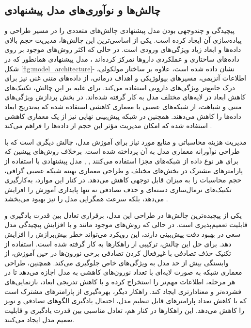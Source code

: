 \subsection{چالش‌ها و نوآوری‌های مدل پیشنهادی}

پیچیدگی و چندوجهی بودن مدل پیشنهادی چالش‌های متعددی را در مسیر طراحی و پیاده‌سازی آن ایجاد کرده است. یکی از اساسی‌ترین این چالش‌ها، مدیریت حجم بالای داده‌ها و ابعاد زیاد ویژگی‌های ورودی است. در حالی که اکثر روش‌های موجود بر روی داده‌های ساختاری و عملکردی داروها تمرکز کرده‌اند \cite{ref_deng2020, ref_shi2024}، مدل پیشنهادی همانطور که در شکل \ref{fig:model_architecture}- نشان داده شده است، علاوه بر ساختار مولکولی، اطلاعات آنزیمی، مسیرهای بیولوژیکی و اهداف درمانی، از داده‌های متنی غنی نیز برای درک جامع‌تر ویژگی‌های دارویی استفاده می‌کند. برای غلبه بر این چالش، تکنیک‌های کاهش ابعاد در لایه‌های مختلف مدل به کار گرفته شده‌اند. در بخش پردازش ویژگی‌های متنی و شباهت، از شبکه‌های عصبی با معماری کاهشی استفاده شده که به‌تدریج ابعاد داده‌ها را کاهش می‌دهند. همچنین در شبکه پیش‌بینی نهایی نیز از یک معماری کاهشی استفاده شده که امکان مدیریت مؤثر این حجم از داده‌ها را فراهم می‌کند \cite{ref_dai2020}.

مدیریت هزینه محاسباتی و منابع مورد نیاز برای آموزش مدل، چالش دیگری است که با طراحی نوآورانه معماری مدل به آن پرداخته شده است. برخلاف روش‌های پیشین که برای هر نوع داده از شبکه‌های مجزا استفاده می‌کنند \cite{ref_ryu2018}, \cite{ref_lin2022}, مدل پیشنهادی با استفاده از پارامترهای مشترک در بخش‌های مختلف و طراحی معماری بهینه شبکه عصبی گرافی، حجم محاسبات را به میزان قابل توجهی کاهش می‌دهد. در کنار این موارد، به‌کارگیری تکنیک‌های نرمال‌سازی دسته‌ای و حذف تصادفی نه تنها پایداری آموزش را افزایش می‌دهد، بلکه سرعت همگرایی مدل را نیز بهبود می‌بخشد \cite{ref_nyamabo2021}.

یکی از پیچیده‌ترین چالش‌ها در طراحی این مدل، برقراری تعادل بین قدرت یادگیری و قابلیت تعمیم‌پذیری است. در حالی که روش‌های موجود مانند \cite{ref_he2023} و \cite{ref_shi2024} با افزایش پیچیدگی مدل سعی در بهبود دقت پیش‌بینی دارند، این رویکرد می‌تواند خطر بیش‌برازش را افزایش دهد. برای حل این چالش، ترکیبی از راهکارها به کار گرفته شده است. استفاده از تکنیک حذف تصادفی با غیرفعال کردن تصادفی برخی نورون‌ها در حین آموزش، از وابستگی بیش از حد مدل به ویژگی‌های خاص جلوگیری می‌کند. همچنین، طراحی معماری شبکه به صورت لایه‌ای با تعداد نورون‌های کاهشی به مدل اجازه می‌دهد تا در هر مرحله، اطلاعات مهم‌تر را استخراج کرده و با کاهش تدریجی ابعاد، بازنمایی‌های فشرده‌تر و معنادارتری ایجاد کند. راهکار دیگر، بهره‌گیری از پارامترهای مشترک است که با کاهش تعداد پارامترهای قابل تنظیم مدل، احتمال یادگیری الگوهای تصادفی و نویز را کاهش می‌دهد. این راهکارها در کنار هم، تعادل مناسبی بین قدرت یادگیری و قابلیت تعمیم مدل ایجاد می‌کنند.

